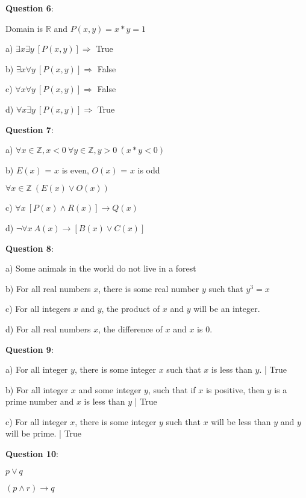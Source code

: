 \documentclass{article} %
\newcommand{\question}[2][]{\begin{flushleft}
        \textbf{Question #1}: \textit{#2}

\end{flushleft}}
\begin{document}
    \question[6]{}

    Domain is $\mathbb{R}$ and $P(x, y) = x * y = 1$

    \hspace{0cm}

    a) $\exists x \exists y\ [P(x, y)] \Rightarrow$ True

    b) $\exists x \forall y\ [P(x, y)] \Rightarrow$ False

    c) $\forall x \forall y\ [P(x, y)] \Rightarrow$ False

    d) $\forall x \exists y\ [P(x, y)] \Rightarrow$ True
    
    \question[7]{}
    
    a) $\forall x \in \mathbb{Z},x < 0\ \forall y \in \mathbb{Z},y > 0\ (x * y < 0)$

    b) $E(x)$ = $x$ is even, $O(x)$ = $x$ is odd
    
    \tabto*{0.98cm}$\forall x \in \mathbb{Z}\ (E(x) \lor O(x))$

    c) $\forall x\ [P(x) \land R(x)] \rightarrow Q(x)$

    d) $\neg \forall x\ A(x) \rightarrow [B(x) \lor C(x)]$

    \question[8]{}

    a) Some animals in the world do not live in a forest

    b) For all real numbers $x$, there is some real number $y$ such that $y^3 = x$

    c) For all integers $x$ and $y$, the product of $x$ and $y$ will be an integer.

    d) For all real numbers $x$, the difference of $x$ and $x$ is 0. 

    \question[9]{}

    a) For all integer $y$, there is some integer $x$ such that $x$ is less than $y$. | True 

    b) For all integer $x$ and some integer $y$, such that if $x$ is positive, then $y$ is a prime number and \tabto{0.98cm}$x$ is less than $y$ | True

    c) For all integer $x$, there is some integer $y$ such that $x$ will be less than $y$ and $y$ will be prime. \tabto{0.98cm}| True

    \newpage

    \question[10]{}
    
    \centering

    \phantom{`}$p \lor q$ 

    \underline{$(p \land r) \rightarrow q$} %
\end{document}
